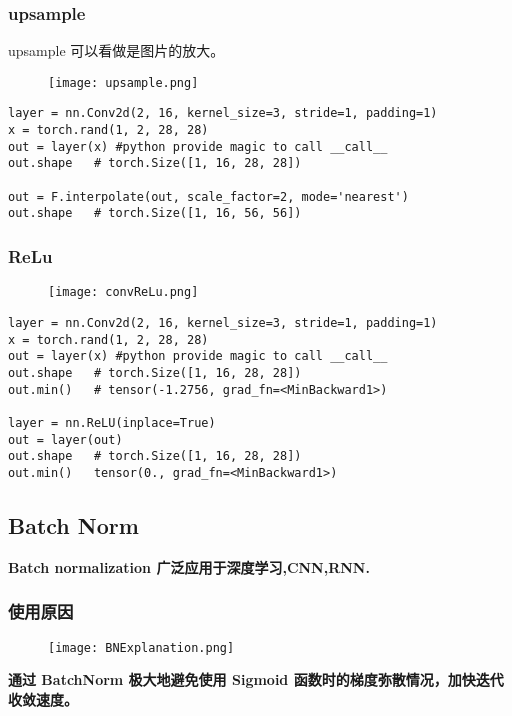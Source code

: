 \subsubsection{upsample}
upsample 可以看做是图片的放大。
\begin{figure}[!h]
  \centering
  \texttt{[image: upsample.png]}
\end{figure}

\begin{lstlisting}
layer = nn.Conv2d(2, 16, kernel_size=3, stride=1, padding=1)
x = torch.rand(1, 2, 28, 28)
out = layer(x) #python provide magic to call __call__
out.shape   # torch.Size([1, 16, 28, 28])

out = F.interpolate(out, scale_factor=2, mode='nearest')
out.shape   # torch.Size([1, 16, 56, 56])
\end{lstlisting}


\subsubsection{ReLu}
\begin{figure}[!h]
  \centering
  \texttt{[image: convReLu.png]}
\end{figure}

\begin{lstlisting}
layer = nn.Conv2d(2, 16, kernel_size=3, stride=1, padding=1)
x = torch.rand(1, 2, 28, 28)
out = layer(x) #python provide magic to call __call__
out.shape   # torch.Size([1, 16, 28, 28])
out.min()   # tensor(-1.2756, grad_fn=<MinBackward1>)

layer = nn.ReLU(inplace=True)
out = layer(out)
out.shape   # torch.Size([1, 16, 28, 28])
out.min()   tensor(0., grad_fn=<MinBackward1>)
\end{lstlisting}

\subsection{Batch Norm}
\textbf{Batch normalization 广泛应用于深度学习,CNN,RNN.}
\subsubsection{使用原因}
\begin{figure}[!h]
  \centering
  \texttt{[image: BNExplanation.png]}
\end{figure}

\textbf{通过 BatchNorm 极大地避免使用 Sigmoid 函数时的梯度弥散情况，加快迭代收敛速度。}

